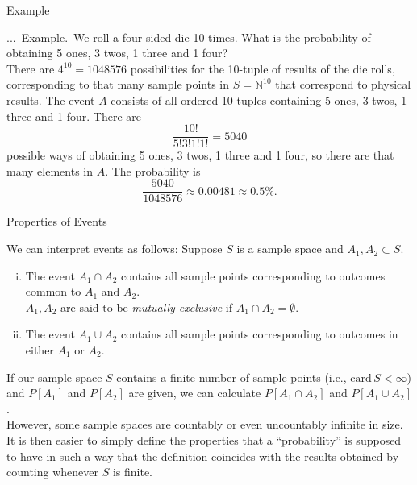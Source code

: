 \documentclass[smaller,hyperref={CJKbookmarks=true}]{beamer}
\newcommand{\N}{\mathbb{N}} \newcommand{\Z}{\mathbb{Z}} \newcommand{\Q}{\mathbb{Q}}
\newcounter{zhuo}[subsection]
\renewcommand{\thezhuo}{\thesection.\thesubsection.\arabic{zhuo}}
\newenvironment{EXAMPLE}{\stepcounter{zhuo}\alert{\!\thezhuo.~Example.\,}}{}
\begin{document}
\begin{frame}[t]{Example}
\begin{spacing}{1.05}
\begin{EXAMPLE}
We roll a four-sided die 10 times. What is the probability of obtaining 5 ones, 3 twos, 1 three and 1 four?\\[6pt]
There are $4^{10}=1048576$ possibilities for the 10-tuple of results of the die rolls, corresponding to that many sample points in $S=\N^{10}$ that correspond to physical results. The event $A$ consists of all ordered 10-tuples containing 5 ones, 3 twos, 1 three and 1 four. There are
\[\frac{10!}{5!3!1!1!}=5040\]
possible ways of obtaining 5 ones, 3 twos, 1 three and 1 four, so there are that many elements in $A$. The probability is
\[\frac{5040}{1048576}\approx 0.00481\approx 0.5\%.\]
\end{EXAMPLE}
\end{spacing}
\end{frame}
\begin{frame}[t]{Properties of Events}
\begin{spacing}{1.1}
We can interpret events as follows: Suppose $S$ is a sample space and $A_1,A_2\subset S$.
\begin{enumerate}[(i)]
  \item The event $A_1\cap A_2$ contains all sample points corresponding to outcomes common to $A_1$ and $A_2$.\\[5pt]
      $A_1,A_2$ are said to be \emph{mutually exclusive} if $A_1\cap A_2=\emptyset$.
  \item The event $A_1\cup A_2$ contains all sample points corresponding to outcomes in either $A_1$ or $A_2$.
\end{enumerate}
If our sample space $S$ contains a finite number of sample points (i.e., $\text{card}\,S<\infty$) and $P[A_1]$ and $P[A_2]$ are given, we can calculate $P[A_1\cap A_2]$ and $P[A_1\cup A_2]$.\\[6pt]
However, some sample spaces are countably or even uncountably infinite in
size. It is then easier to simply define the properties that a ``probability'' is
supposed to have in such a way that the definition coincides with the
results obtained by counting whenever $S$ is finite.
\end{spacing}
\end{frame}
\end{document}
